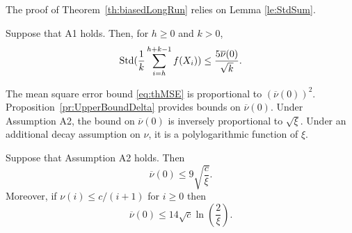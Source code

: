 \documentclass[a4paper,11pt]{article}
\begin{document}
The proof of Theorem~\ref{th:biasedLongRun} relies on Lemma \ref{le:StdSum}.
\begin{lemma}\label{le:StdSum}
Suppose that A1 holds. Then, for \(h\ge0\) and  \(k>0\),\begin{equation}\label{eq:stdSumBound}
{\rm Std}(\frac{1}{k}\sum^{h+k-1}_{i=h}f(X_{i}))\leq\frac{5\overline{\nu}(0)}{\sqrt{k}}.
\end{equation}
\end{lemma}
The mean square error bound \eqref{eq:thMSE} is proportional to \((\overline{\nu}(0))^{2}\). Proposition~\ref{pr:UpperBoundDelta} provides  bounds on \(\overline{\nu}(0)\). Under Assumption A2, the bound on \(\overline{\nu}(0)\) is inversely proportional to \(\sqrt{\xi}\). Under an additional decay assumption on \(\nu\), it is a polylogarithmic function of \(\xi\).
  
\begin{proposition}\label{pr:UpperBoundDelta}Suppose that Assumption A2 holds. Then 
\begin{equation}\label{eq:deltaBound}\overline{\nu}(0)\leq9\sqrt{\frac{ c}{\xi}}.\end{equation}
Moreover, if \(\nu(i)\leq c/(i+1)\) for \(i\geq0\) then\begin{equation}\label{eq:deltaBoundGeom}
\overline{\nu}(0)\leq14\sqrt{c}\ln\left(\frac{2}{\xi}\right).
\end{equation}
\end{proposition}
\end{document}
